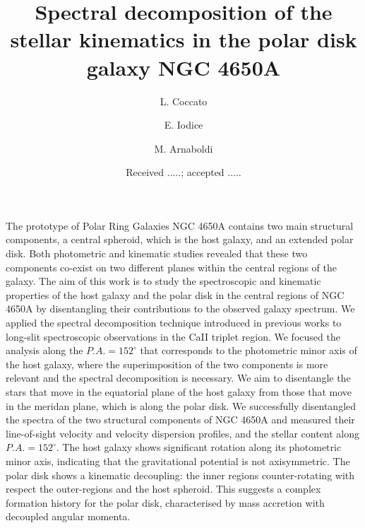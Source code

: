 \documentclass{aa}
\begin{document}
 
\newcommand{\kms}{km s$^{-1}$}


   \title{Spectral decomposition of the stellar kinematics in the polar disk
galaxy NGC 4650A}


   \author{L. Coccato 
          \and
          E. Iodice 
          \and
          M. Arnaboldi 
          }


   \date{Received .....; accepted .....}

 
  \abstract
  {The prototype of Polar Ring Galaxies NGC 4650A contains two main
    structural components, a central spheroid, which is the host galaxy,
    and an extended polar disk. Both photometric and kinematic
    studies revealed that these two components co-exist on two
    different planes within the central regions of the galaxy.}
   {The aim of this work is to study the spectroscopic and kinematic
     properties of the host galaxy and the polar disk in the central
     regions of NGC 4650A by disentangling their contributions to the 
     observed galaxy spectrum.}
   {We applied the spectral decomposition technique introduced in
     previous works to long-slit spectroscopic observations in the
     Ca{\small II} triplet region.  We focused the analysis along the
     $P.A. = 152^{\circ}$ that corresponds to the photometric minor
     axis of the host galaxy, where the superimposition of the two
     components is more relevant and the spectral decomposition is
     necessary. We aim to disentangle the stars that move in the
     equatorial plane of the host galaxy from those that move in the
     meridan plane, which is along the polar disk.}
   {We successfully disentangled the spectra of the two structural
     components of NGC 4650A and measured  their line-of-sight velocity and
     velocity dispersion profiles, and the stellar content along
     $P.A. = 152^{\circ}$. The host galaxy shows significant rotation
     along its photometric minor axis, indicating that the
     gravitational potential is not axisymmetric. The polar disk shows
     a kinematic decoupling: the inner regions counter-rotating
     with respect the outer-regions and the host spheroid. This
     suggests a complex formation history for the polar disk,
     characterised by mass accretion with decoupled angular momenta.}
{}
\end{document}
